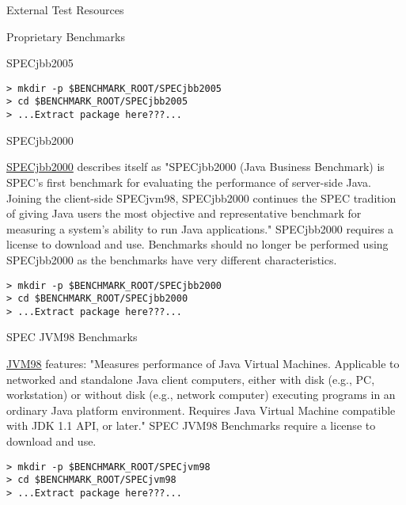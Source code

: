 \begin{section}{External Test Resources}
\begin{subsection}{Proprietary Benchmarks}
\begin{subsubsection}{SPECjbb2005}
\begin{lstlisting}[breaklines=true, breakatwhitespace=false]
> mkdir -p $BENCHMARK_ROOT/SPECjbb2005
> cd $BENCHMARK_ROOT/SPECjbb2005
> ...Extract package here???...
\end{lstlisting}

\end{subsubsection}

\begin{subsubsection}{SPECjbb2000}

\href{http://www.spec.org/jbb2000/}{SPECjbb2000} describes itself as "SPECjbb2000 (Java Business Benchmark) is SPEC's first benchmark for evaluating the performance of server-side Java. Joining the client-side SPECjvm98, SPECjbb2000 continues the SPEC tradition of giving Java users the most objective and representative benchmark for measuring a system's ability to run Java applications." SPECjbb2000 requires a license to download and use. Benchmarks should no longer be performed using SPECjbb2000 as the benchmarks have very different characteristics.

\begin{lstlisting}[breaklines=true, breakatwhitespace=false]
> mkdir -p $BENCHMARK_ROOT/SPECjbb2000
> cd $BENCHMARK_ROOT/SPECjbb2000
> ...Extract package here???...
\end{lstlisting}

\end{subsubsection}

\begin{subsubsection}{SPEC JVM98 Benchmarks}

\href{http://www.spec.org/jvm98/}{JVM98} features: "Measures performance of Java Virtual Machines. Applicable to networked and standalone Java client computers, either with disk (e.g., PC, workstation) or without disk (e.g., network computer) executing programs in an ordinary Java platform environment. Requires Java Virtual Machine compatible with JDK 1.1 API, or later." SPEC JVM98 Benchmarks require a license to download and use.

\begin{lstlisting}[breaklines=true, breakatwhitespace=false]
> mkdir -p $BENCHMARK_ROOT/SPECjvm98
> cd $BENCHMARK_ROOT/SPECjvm98
> ...Extract package here???...
\end{lstlisting}

\end{subsubsection}

\end{subsection}

\end{section}